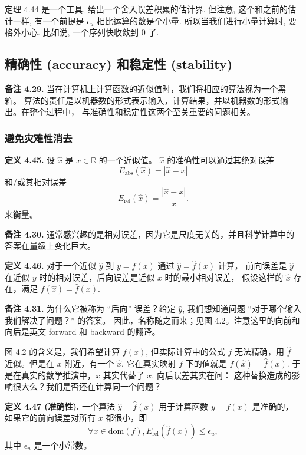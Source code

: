 \documentclass[a4paper]{ctexart}
\begin{document}
{定理 4.44 是一个工具, 给出一个舍入误差积累的估计界. 但注意, 这个和之前的估计一样,
有一个前提是 $\epsilon_u$ 相比运算的数是个小量. 所以当我们进行小量计算时, 要格外小心.
比如说, 一个序列快收敛到 $0$ 了.

\subsection{精确性 (accuracy) 和稳定性 (stability)}

\noindent \textbf{备注 4.29.} 当在计算机上计算函数的近似值时，我们将相应的算法视为一个黑箱。
算法的责任是以机器数的形式表示输入，计算结果，并以机器数的形式输出。在整个过程中，
与准确性和稳定性这两个至关重要的问题相关。

\subsubsection{避免灾难性消去}

\noindent \textbf{定义 4.45.} 设 $\hat{x}$ 是 $x \in \mathbb{R}$ 的一个近似值。
$\hat{x}$ 的准确性可以通过其绝对误差
\[
  E_{\text{abs}}(\hat{x}) = |\hat{x} - x| \tag{4.24}
\]
和/或其相对误差
\[
  E_{\text{rel}}(\hat{x}) = \frac{|\hat{x} - x|}{|x|}. \tag{4.25}
\]
来衡量。

\noindent \textbf{备注 4.30.} 通常感兴趣的是相对误差，因为它是尺度无关的，并且科学计算中的答案在量级上变化巨大。

\noindent \textbf{定义 4.46.} 对于一个近似 $\hat{y}$ 到 $y = f(x)$ 通过 $\hat{y} = \hat{f}(x)$ 计算，
前向误差是 $\hat{y}$ 在近似 $y$ 时的相对误差，后向误差是近似 $x$ 时的最小相对误差，
假设这样的 $\hat{x}$ 存在，满足 $f(\hat{x}) = \hat{f}(x)$.

\noindent \textbf{备注 4.31.} 为什么它被称为 ``后向'' 误差？给定 $\hat{y}$, 我们想知道问题 ``对于哪个输入我们解决了问题？'' 的答案。
因此，名称随之而来；见图 4.2。注意这里的向前和向后是英文 forward 和 backward 的翻译。

图 4.2 的含义是，我们希望计算 $f(x)$, 但实际计算中的公式 $f$ 无法精确，用 $\hat{f}$ 近似。但是在 $x$ 附近，有一个 $\hat{x}$,
它在真实映射 $f$ 下的值就是 $f(\hat{x}) = \hat{f}(x)$. 于是在真实的数学推演中，$\hat{x}$ 其实代替了 $x$. 向后误差其实在问：
这种替换造成的影响很大么？我们是否还在计算同一个问题？

\noindent \textbf{定义 4.47 (准确性).} 一个算法 $\hat{y} = \hat{f}(x)$ 用于计算函数 $y = f(x)$ 是准确的，
如果它的前向误差对所有 $x$ 都很小，即 
$$
\forall x \in \text{dom}(f), E_{\text{rel}}(\hat{f}(x)) \leq \epsilon_u,
$$
其中 $\epsilon_u$ 是一个小常数。

}
\end{document}

